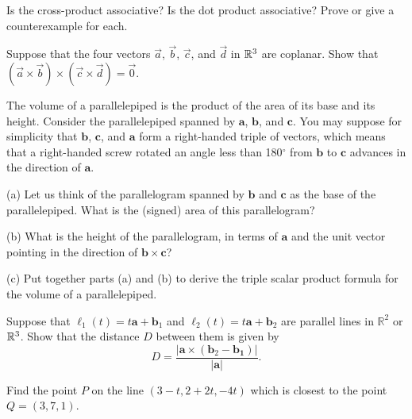 \documentclass[svgnames]{watsonbook}
\begin{document}
\begin{aexercise}
  Is the cross-product associative? Is the dot product associative?
  Prove or give a counterexample for each.
\end{aexercise}

\begin{aexercise}
  Suppose that the four vectors $\vec{a}$, $\vec{b}$, $\vec{c}$, and
  $\vec{d}$ in $\mathbb{R}^3$ are coplanar. Show that \\
  $(\vec{a}\times\vec{b})\times(\vec{c}\times\vec{d})=\vec{0}$.
\end{aexercise}

\begin{aexercise}
  The volume of a parallelepiped is the product of the area of its
  base and its height. Consider the parallelepiped spanned by
  $\mathbf{a}$, $\mathbf{b}$, and $\mathbf{c}$. You may suppose for
  simplicity that $\mathbf{b}$, $\mathbf{c}$, and $\mathbf{a}$ form a
  right-handed triple of vectors, which means that a right-handed
  screw rotated an angle less than 180$^\circ$ from $\mathbf{b}$ to
  $\mathbf{c}$ advances in the direction of $\mathbf{a}$.

  (a) Let us think of the parallelogram spanned by $\mathbf{b}$ and
  $\mathbf{c}$ as the base of the parallelepiped. What is the (signed)
  area of this parallelogram?

  (b) What is the height of the parallelogram, in terms of
  $\mathbf{a}$ and the unit vector pointing in the direction of
  $\mathbf{b} \times\mathbf{c}$?

  (c) Put together parts (a) and (b) to derive the triple scalar
  product formula for the volume of a parallelepiped.
\end{aexercise}

\begin{aexercise}
  Suppose that $\ell_1(t)=t\mathbf{a}+\mathbf{b}_1$ and $\ell_2(t)=t\mathbf{a}+\mathbf{b}_2$ are parallel lines in $\mathbb{R}^2$ or $\mathbb{R}^3$. Show that the distance $D$ between them is given by 
\[
D = \frac{|\mathbf{a}\times(\mathbf{b}_2-\mathbf{b_1})|}{|\mathbf{a}|}. 
\]
\end{aexercise}

\begin{aexercise}
  Find the point $P$ on the line $(3-t,2+2t,-4t)$ which is closest to the point $Q=(3,7,1)$.
\end{aexercise}
\end{document}
